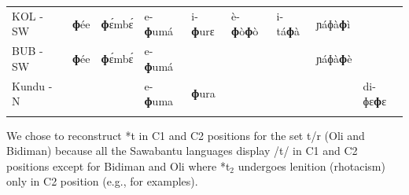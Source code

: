 \documentclass[output=paper,colorlinks,citecolor=brown
]{langscibook}
\begin{document}
\begin{table}
{\begin{tabular}{lllllllll}
    KOL - SW                  & \textbf{ɸ}ée                    & \textbf{ɸ}ɛ́mbɛ́                 & e-\textbf{ɸ}umá                  & i-\textbf{ɸ}urɛ                 & è-\textbf{ɸ}ò\textbf{ɸ}ò             & i-tá\textbf{ɸ}à                & ɲáɸà\textbf{ɸ}ì                &                        \\
BUB - SW                  & \textbf{ɸ}ée                    & \textbf{ɸ}ɛ́mbɛ́                 & e-\textbf{ɸ}umá                  &                        &                       &                         & ɲáɸà\textbf{ɸ}è                &                        \\
Kundu - N                 &                         &                         & e-\textbf{ɸ}uma                  & \textbf{ɸ}ura                   &                       &                         &                          & di-ɸɛ\textbf{ɸ}ɛ                                  \\ 
   \lspbottomrule
 \end{tabular}
 }
\end{table}

We chose to reconstruct *t in C1 and C2 positions for the set t/r (Oli and Bidiman) because all the Sawabantu languages display /t/ in C1 and C2 positions except for Bidiman and Oli where *t$_2$ undergoes lenition (rhotacism) only in C2 position (e.g.,  for examples). 
\end{document}
